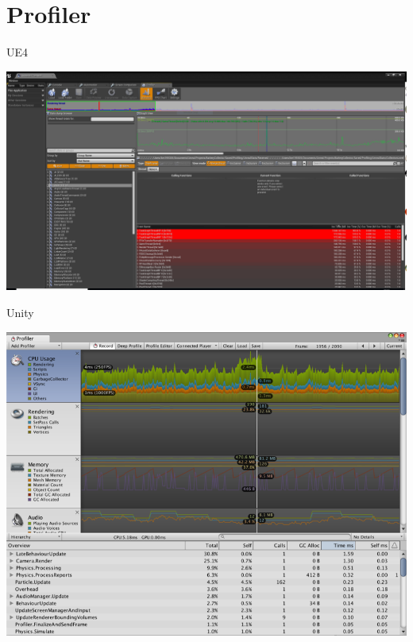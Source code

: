 \part{Profiler}
\frame{\partpage}

\begin{frame}{UE4}
	\begin{center}
		\includegraphics[width=\textwidth,height=\textheight,keepaspectratio]{UnrealProfilerWindow}
	\end{center}
\end{frame}


\begin{frame}{Unity}
	\begin{center}
		\includegraphics[width=\textwidth,height=\textheight,keepaspectratio]{UnityProfilerWindow}
	\end{center}
\end{frame}

